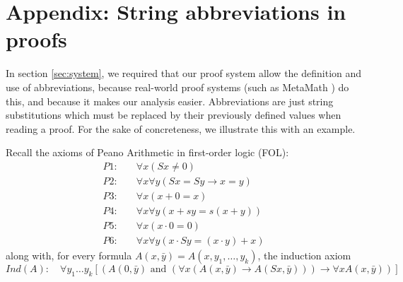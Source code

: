 \documentclass[onecolumn]{miri-tech-article}
\numberwithin{equation}{section}
\theoremstyle{definition}
\renewcommand{\implies}{\rightarrow}
\newcommand{\AND}{{\textrm{ and }}}
\renewcommand{\-}{^{-1}}
\begin{document}
\section{Appendix: String abbreviations in proofs}

In section \ref{sec:system}, we required that our proof system allow the definition and use of abbreviations, because real-world proof systems (such as MetaMath \cite{Megill:2007}) do this, and because it makes our analysis easier.  Abbreviations are just string substitutions which must be replaced by their previously defined values when reading a proof.  For the sake of concreteness, we illustrate this with an example.

Recall the axioms of Peano Arithmetic in first-order logic (FOL):
\begin{align*}
P1: \quad & \forall x (Sx \neq 0)\\
P2: \quad & \forall x \forall y (Sx = Sy \implies x = y)\\
P3: \quad & \forall x (x + 0 = x)\\
P4: \quad & \forall x \forall y (x + sy = s(x + y))\\
P5: \quad & \forall x (x \cdot 0 = 0)\\
P6: \quad & \forall x \forall y ( x \cdot Sy = (x \cdot y) + x)
\end{align*}
along with, for every formula $A(x,\bar y) = A(x,y_1,\ldots,y_k)$, the induction axiom
$$Ind(A): \quad \forall y_1 \ldots y_k [(A(0,\bar y) \AND (\forall x (A(x,\bar y) \implies A(Sx,\bar y))) \implies \forall x A(x,\bar y))]$$
\end{document}
